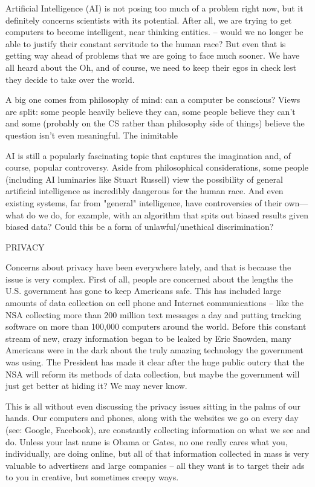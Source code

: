 \documentclass{article}
\begin{document}
Artificial Intelligence (AI) is not posing too much of a problem right
now, but it definitely concerns scientists with its potential.  After
all, we are trying to get computers to become intelligent, near
thinking entities.   – would we no longer be able
to justify their constant servitude to the human race?  But even that
is getting way ahead of problems that we are going to face much
sooner.  We have all heard about the     Oh, and of course, we need to keep their egos in
check lest they decide to take over the world.

A big one comes from philosophy of mind: can a computer be conscious?
Views are split: some people heavily believe they can, some people
believe they can't and some (probably on the CS rather than philosophy
side of things) believe the question isn't even meaningful. The
inimitable 

AI is still a popularly fascinating topic that captures the
imagination and, of course, popular controversy. Aside from
philosophical considerations, some people (including AI luminaries
like Stuart Russell) view the possibility of general artificial
intelligence as incredibly dangerous for the human race. And even
existing systems, far from "general" intelligence, have controversies
of their own—what do we do, for example, with an algorithm that spits
out biased results given biased data? Could this be a form of
unlawful/unethical discrimination?

PRIVACY

Concerns about privacy have been everywhere lately, and that is
because the issue is very complex.  First of all, people are concerned
about the lengths the U.S. government has gone to keep Americans safe.
This has included large amounts of data collection on cell phone and
Internet communications – like the NSA collecting more than 200
million text messages a day and putting tracking software on more than
100,000 computers around the world.  Before this constant stream of
new, crazy information began to be leaked by Eric Snowden, many
Americans were in the dark about the truly amazing technology the
government was using.  The President has made it clear after the huge
public outcry that the NSA will reform its methods of data collection,
but maybe the government will just get better at hiding it?  We may
never know.

This is all without even discussing the privacy issues sitting in the
palms of our hands.  Our computers and phones, along with the websites
we go on every day (see: Google, Facebook), are constantly collecting
information on what we see and do.  Unless your last name is Obama or
Gates, no one really cares what you, individually, are doing online,
but all of that information collected in mass is very valuable to
advertisers and large companies – all they want is to target their ads
to you in creative, but sometimes creepy ways.
\end{document}
